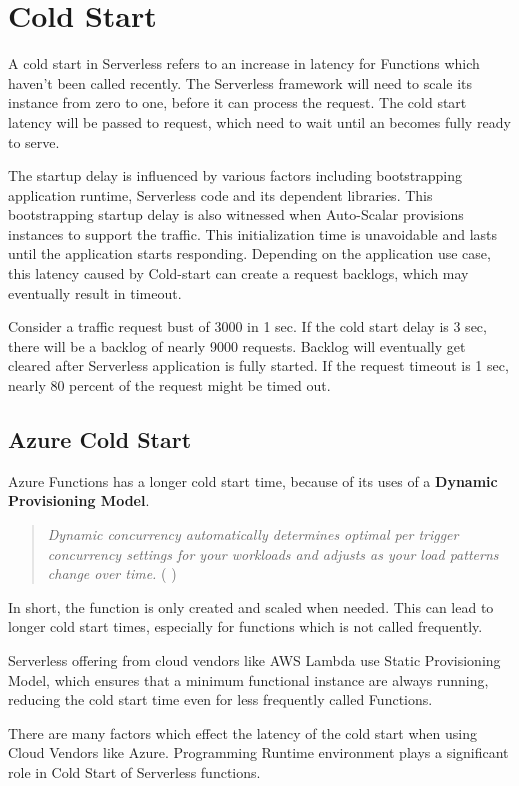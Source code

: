 \documentclass{article}
\begin{document}
\section{Cold Start}

\begin{flushleft}
\par
A cold start in Serverless refers to an increase in latency for Functions which haven’t been called recently. The Serverless framework will need to scale its instance from zero to one, before it can process the request. The cold start latency will be passed to request, which need to wait until an becomes fully ready to serve.
\par
 The startup delay is influenced by various factors including bootstrapping application runtime, Serverless code and its dependent libraries. This bootstrapping startup delay is also witnessed when Auto-Scalar provisions instances to support the traffic. This initialization time is unavoidable and lasts until the application starts responding. Depending on the application use case, this latency caused by Cold-start can create a request backlogs, which may eventually result in timeout.
\par
 Consider a traffic request bust of 3000 in 1 sec. If the cold start delay is 3 sec, there will be a backlog of nearly 9000 requests. Backlog will eventually get cleared after Serverless application is fully started. If the request timeout is 1 sec, nearly 80 percent of the request might be timed out.

\subsection{Azure Cold Start}
Azure Functions has a longer cold start time, because of its uses of a \textbf{Dynamic Provisioning Model}.

\begin{quote}
    \textit{Dynamic concurrency automatically determines optimal per trigger concurrency settings for your workloads and adjusts as your load patterns change over time.}    ( \cite{Cachai_Gailey_2022} )
\end{quote}
\par
In short, the function is only created and scaled when needed. This can lead to longer cold start times, especially for functions which is not called frequently.
\par
Serverless offering from cloud vendors like AWS Lambda use Static Provisioning Model, which ensures that a minimum functional instance  are always running, reducing the cold start time even for less frequently called Functions.
\par
There are many factors which effect the latency of the cold start when using Cloud Vendors like Azure. Programming Runtime environment plays a significant role in Cold Start of Serverless functions.


\end{flushleft}
\end{document}
